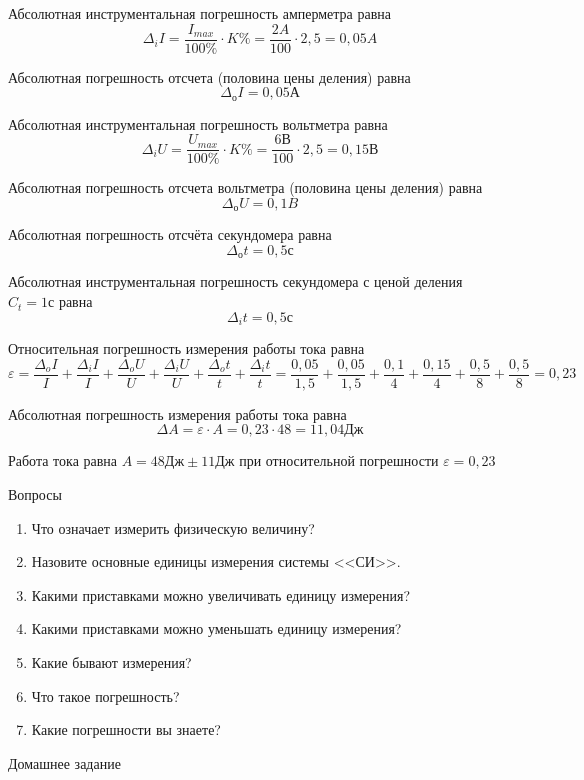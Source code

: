 \documentclass[a6paper, 11pt]{diss_4}
\renewcommand{\'}{\,'}
\begin{document}
Абсолютная инструментальная погрешность амперметра равна
\[\Delta_i I=\frac{I_{max}}{100\%}\cdot K\%=\frac{2A}{100}\cdot2,5=0,05A\]

Абсолютная погрешность отсчета (половина цены деления) равна
\[\Delta_о I = 0,05А \]

Абсолютная инструментальная погрешность вольтметра равна
\[\Delta_i U=\frac{U_{max}}{100\%}\cdot K\%=\frac{6В}{100}\cdot2,5=0,15В\]

Абсолютная погрешность отсчета вольтметра (половина цены деления) равна
\[\Delta_о U = 0,1B\]

Абсолютная погрешность отсчёта секундомера равна
\[\Delta_о t = 0,5с\]

Абсолютная  инструментальная погрешность  секундомера с ценой деления $C_t=1с$
равна
\[\Delta_i t = 0,5с\]

Относительная погрешность измерения работы тока равна
\[\varepsilon=\frac{\Delta_o I}{I}+\frac{\Delta_i I}{I}+\frac{\Delta_o U}{U}+
\frac{\Delta_i U}{U}+\frac{\Delta_o t}{t}+\frac{\Delta_i t}{t}=
\frac{0,05}{1,5}+\frac{0,05}{1,5}+\frac{0,1}{4}+\frac{0,15}{4}+
\frac{0,5}{8}+\frac{0,5}{8}=0,23\]

Абсолютная погрешность измерения работы тока равна
\[\Delta A=\varepsilon\cdot A=0,23\cdot48=11,04Дж\]

 Работа тока равна $A=48Дж\pm11Дж$ при относительной погрешности
$\varepsilon=0,23$

\begin{center}
Вопросы
\end{center}

\begin{enumerate}
\item Что означает измерить физическую величину?
\item Назовите основные единицы измерения системы <<СИ>>.
\item Какими приставками можно увеличивать единицу измерения?
\item Какими приставками можно уменьшать единицу измерения?
\item Какие бывают измерения?
\item Что такое погрешность?
\item Какие погрешности вы знаете?
\end{enumerate}

\begin{center}
Домашнее задание
\end{center}
\end{document}
